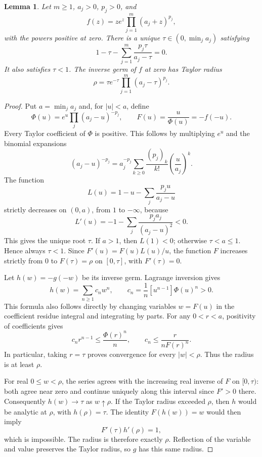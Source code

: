 \documentclass[11pt]{article}
\newtheorem{lemma}{Lemma}
\begin{document}
\begin{lemma}\label{positive}
Let \(m\ge1\), \(a_j>0\), \(p_j>0\), and
\[
 f(z)=ze^z\prod_{j=1}^m(a_j+z)^{p_j},
\]
with the powers positive at zero. There is a unique
\(\tau\in(0,\min_j a_j)\) satisfying
\begin{equation}\label{tau}
 1-\tau-\sum_{j=1}^m\frac{p_j\tau}{a_j-\tau}=0.
\end{equation}
It also satisfies \(\tau<1\). The inverse germ of \(f\) at zero
has Taylor radius
\begin{equation}\label{radius}
 \rho=\tau e^{-\tau}\prod_{j=1}^m(a_j-\tau)^{p_j}.
\end{equation}
\end{lemma}

\begin{proof}
Put \(a=\min_j a_j\) and, for \(|u|<a\), define
\[
 \Phi(u)=e^u\prod_j(a_j-u)^{-p_j},\qquad
 F(u)=\frac{u}{\Phi(u)}=-f(-u).
\]
Every Taylor coefficient of \(\Phi\) is positive. This follows by
multiplying \(e^u\) and the binomial expansions
\[
 (a_j-u)^{-p_j}
   =a_j^{-p_j}\sum_{k\ge0}\frac{(p_j)_k}{k!}
                       \left(\frac{u}{a_j}\right)^k.
\]
The function
\[
 L(u)=1-u-\sum_j\frac{p_ju}{a_j-u}
\]
strictly decreases on \((0,a)\), from \(1\) to \(-\infty\), because
\[
 L'(u)=-1-\sum_j\frac{p_ja_j}{(a_j-u)^2}<0.
\]
This gives the unique root \(\tau\). If \(a>1\), then \(L(1)<0\);
otherwise \(\tau<a\le1\). Hence always \(\tau<1\).
Since \(F'(u)=F(u)L(u)/u\), the function \(F\) increases strictly
from \(0\) to \(F(\tau)=\rho\) on \([0,\tau]\), with \(F'(\tau)=0\).

Let \(h(w)=-g(-w)\) be its inverse germ. Lagrange inversion gives
\begin{equation}\label{lagrange}
 h(w)=\sum_{n\ge1}c_nw^n,\qquad
 c_n=\frac1n[u^{n-1}]\Phi(u)^n>0.
\end{equation}
This formula also follows directly by changing variables \(w=F(u)\)
in the coefficient residue integral and integrating by parts.
For any \(0<r<a\), positivity of coefficients gives
\[
 c_n r^{n-1}\le\frac{\Phi(r)^n}{n},
 \qquad c_n\le\frac{r}{nF(r)^n}.
\]
In particular, taking \(r=\tau\) proves convergence for every
\(|w|<\rho\). Thus the radius is at least \(\rho\).

For real \(0\le w<\rho\), the series agrees with the increasing
real inverse of \(F\) on \([0,\tau)\): both agree near zero and
continue uniquely along this interval since \(F'>0\) there.
Consequently \(h(w)\to\tau\) as \(w\uparrow\rho\).
If the Taylor radius exceeded \(\rho\), then \(h\) would be
analytic at \(\rho\), with \(h(\rho)=\tau\). The identity
\(F(h(w))=w\) would then imply
\[
 F'(\tau)h'(\rho)=1,
\]
which is impossible. The radius is therefore exactly \(\rho\).
Reflection of the variable and value preserves the Taylor radius,
so \(g\) has this same radius.
\end{proof}
\end{document}
